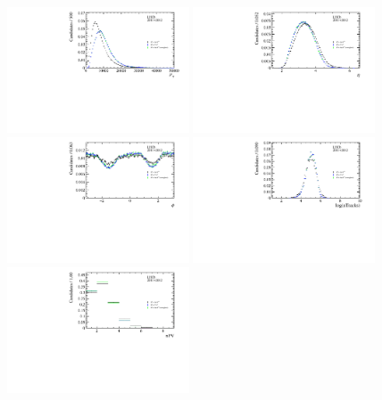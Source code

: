 \begin{figure}[tbp]
    \centering
    \includegraphics[width=0.48\textwidth]{08FlavourTagging/figs/pT_weighted.pdf}
    \includegraphics[width=0.48\textwidth]{08FlavourTagging/figs/eta_weighted.pdf}\\
    \includegraphics[width=0.48\textwidth]{08FlavourTagging/figs/phi_weighted.pdf}
    \includegraphics[width=0.48\textwidth]{08FlavourTagging/figs/nTracks_weighted.pdf}\\
    \includegraphics[width=0.48\textwidth]{08FlavourTagging/figs/nPV_weighted.pdf}

\end{figure}
